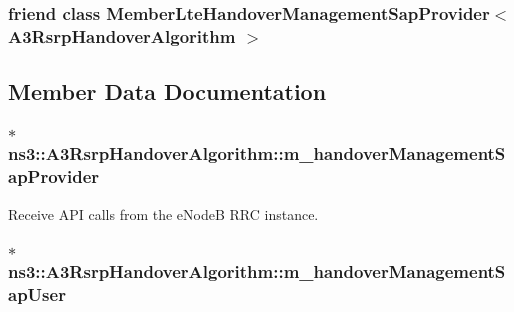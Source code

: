 \subsubsection[{\texorpdfstring{Member\+Lte\+Handover\+Management\+Sap\+Provider$<$ A3\+Rsrp\+Handover\+Algorithm $>$}{MemberLteHandoverManagementSapProvider< A3RsrpHandoverAlgorithm >}}]{\setlength{\rightskip}{0pt plus 5cm}friend class {\bf Member\+Lte\+Handover\+Management\+Sap\+Provider}$<$ {\bf A3\+Rsrp\+Handover\+Algorithm} $>$\hspace{0.3cm}{\ttfamily [friend]}}\hypertarget{classns3_1_1A3RsrpHandoverAlgorithm_a6e30c965b87e5f343296131b96f7a27a}{}\label{classns3_1_1A3RsrpHandoverAlgorithm_a6e30c965b87e5f343296131b96f7a27a}


\subsection{Member Data Documentation}
\subsubsection[{\texorpdfstring{m\+\_\+handover\+Management\+Sap\+Provider}{m_handoverManagementSapProvider}}]{$\ast$ ns3\+::\+A3\+Rsrp\+Handover\+Algorithm\+::m\+\_\+handover\+Management\+Sap\+Provider\hspace{0.3cm}{\ttfamily [private]}}\hypertarget{classns3_1_1A3RsrpHandoverAlgorithm_a36db40273292062cc3e96236c32cbb2a}{}\label{classns3_1_1A3RsrpHandoverAlgorithm_a36db40273292062cc3e96236c32cbb2a}


Receive A\+PI calls from the e\+NodeB R\+RC instance. 

\subsubsection[{\texorpdfstring{m\+\_\+handover\+Management\+Sap\+User}{m_handoverManagementSapUser}}]{$\ast$ ns3\+::\+A3\+Rsrp\+Handover\+Algorithm\+::m\+\_\+handover\+Management\+Sap\+User\hspace{0.3cm}{\ttfamily [private]}}\hypertarget{classns3_1_1A3RsrpHandoverAlgorithm_a2b06a54ee8a69e6943a4bd79bfe8da58}{}\label{classns3_1_1A3RsrpHandoverAlgorithm_a2b06a54ee8a69e6943a4bd79bfe8da58}


